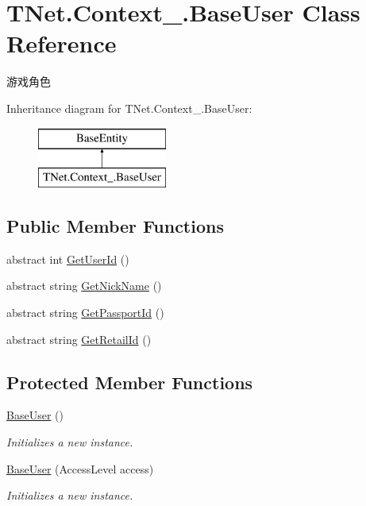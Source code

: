 \hypertarget{class_t_net_1_1_context___1_1_base_user}{}\section{T\+Net.\+Context\+\_\+.\+Base\+User Class Reference}
\label{class_t_net_1_1_context___1_1_base_user}


游戏角色  


Inheritance diagram for T\+Net.\+Context\+\_\+.\+Base\+User\+:\begin{figure}[H]
\begin{center}
\leavevmode
\includegraphics[height=2.000000cm]{class_t_net_1_1_context___1_1_base_user}
\end{center}
\end{figure}
\subsection*{Public Member Functions}
\begin{DoxyCompactItemize}
\item 
abstract int \mbox{\hyperlink{class_t_net_1_1_context___1_1_base_user_a00a8bf3efb9c2c8db8361c76008eb92e}{Get\+User\+Id}} ()
\item 
abstract string \mbox{\hyperlink{class_t_net_1_1_context___1_1_base_user_ac7e52bb0590d3f68f85f73ec7fd9785e}{Get\+Nick\+Name}} ()
\item 
abstract string \mbox{\hyperlink{class_t_net_1_1_context___1_1_base_user_af33ac327ec27e5289629188e041b4760}{Get\+Passport\+Id}} ()
\item 
abstract string \mbox{\hyperlink{class_t_net_1_1_context___1_1_base_user_ad96c7a3cd12c86356f2859489230a4e1}{Get\+Retail\+Id}} ()
\end{DoxyCompactItemize}
\subsection*{Protected Member Functions}
\begin{DoxyCompactItemize}
\item 
\mbox{\hyperlink{class_t_net_1_1_context___1_1_base_user_a63324111892807f2154d8f2f66ed7dfe}{Base\+User}} ()
\begin{DoxyCompactList}\small\item\em Initializes a new instance. \end{DoxyCompactList}\item 
\mbox{\hyperlink{class_t_net_1_1_context___1_1_base_user_a432e9bbceec36fdd25bdfc63494b7523}{Base\+User}} (Access\+Level access)
\begin{DoxyCompactList}\small\item\em Initializes a new instance. \end{DoxyCompactList}\end{DoxyCompactItemize}
